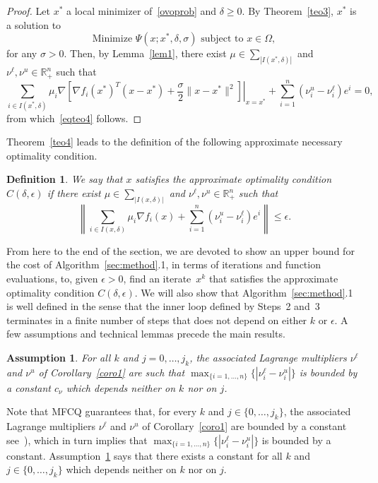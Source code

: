 \documentclass[11pt]{article}
\newcommand{\R}{\mathbb{R}}
\newcommand{\simplex}{\textstyle\sum}
\newtheorem{definition}{Definition}[section]
\newtheorem{assumption}{Assumption}
\begin{document}
\begin{proof}
Let $x^*$ a local minimizer of~\eqref{ovoprob} and $\delta \geq 0$. By Theorem~\ref{teo3}, $x^*$ is a solution to
\[
\mbox{Minimize } \Psi(x;x^*,\delta,\sigma) \mbox{ subject to } x \in \Omega,
\]
for any $\sigma > 0$. Then, by Lemma~\ref{lem1}, there exist $\mu \in \simplex_{|I(x^*,\delta)|}$ and $\nu^\ell, \nu^u \in \R^n_+$ such that
\[
\sum_{i \in I(x^*,\delta)} \mu_i \nabla \left. \left[ \nabla f_i(x^*)^T (x - x^*) + \dfrac{\sigma}{2} \|x -x^*\|^2 \right] \right|_{x=x^*} + \sum_{i=1}^n \left( \nu^u_i - \nu^\ell_i \right) e^i = 0,
\]
from which~\eqref{eqteo4} follows.
\end{proof}

Theorem~\ref{teo4} leads to the definition of the following approximate necessary optimality condition.

\begin{definition}
We say that $x$ satisfies the approximate optimality condition $C(\delta,\epsilon)$ if there exist $\mu \in \simplex_{|I(x,\delta)|}$ and $\nu^\ell, \nu^u \in \R^n_{+}$ such that
\begin{equation} \label{miaprox-box}
\left\| \sum_{i \in I(x,\delta)} \mu_i \nabla f_i(x) + \sum_{i=1}^n \left( \nu^u_i - \nu^\ell_i \right) e^i \right\| \leq \epsilon.
\end{equation}
\end{definition}

From here to the end of the section, we are devoted to show an upper bound for the cost of Algorithm~\ref{sec:method}.1, in terms of iterations and function evaluations, to, given $\epsilon>0$, find an iterate~$x^k$ that satisfies the approximate optimality condition $C(\delta, \epsilon)$. We will also show that Algorithm~\ref{sec:method}.1 is well defined in the sense that the inner loop defined by Steps~2 and~3 terminates in a finite number of steps that does not depend on either $k$ or $\epsilon$. A few assumptions and technical lemmas precede the main results.

\begin{assumption} \label{a2}
For all $k$ and $j=0,\dots,j_k$, the associated Lagrange multipliers $\nu^\ell$ and $\nu^u$ of Corollary~\ref{coro1} are such that $\max_{\{i=1,\dots,n\}}\{|\nu^\ell_i - \nu^u_i|\}$ is bounded by a constant $c_{\nu}$ which depends neither on $k$ nor on $j$.
\end{assumption}

Note that MFCQ guarantees that, for every $k$ and $j \in \{ 0,\dots,j_k \}$, the associated Lagrange multipliers $\nu^\ell$ and $\nu^u$ of Corollary~\ref{coro1} are bounded by a constant see~\cite{gauvin}), which in turn implies that $\max_{\{i=1,\dots,n\}}\{|\nu^\ell_i - \nu^u_i|\}$ is bounded by a constant. Assumption~\ref{a2} says that there exists a constant for all $k$ and $j \in \{ 0,\dots,j_k \}$ which depends neither on $k$ nor on $j$.
\end{document}

